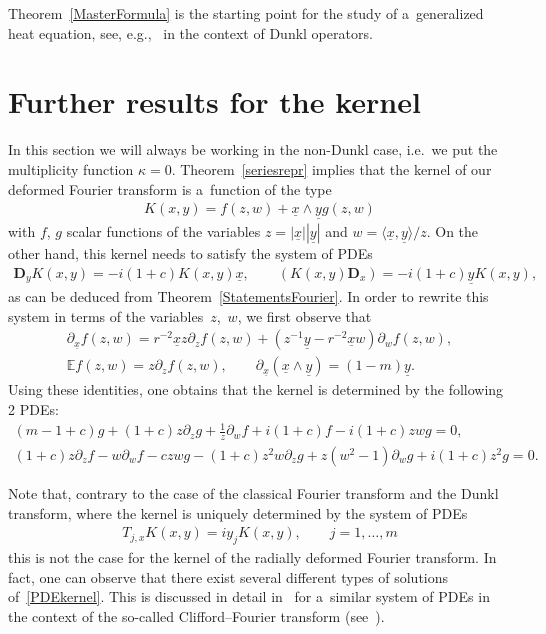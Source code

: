 \documentclass[pdftex]{sigma}
\numberwithin{equation}{section}
\numberwithin{theorem}{section}
\numberwithin{proposition}{section}
\numberwithin{lemma}{section}
\numberwithin{corollary}{section}
\numberwithin{definition}{section}
\numberwithin{example}{section}
\numberwithin{remark}{section}
\numberwithin{note}{section}
\theoremstyle{remark}
\newcommand{\mE}{\mathbb{E}}
\newcommand{\dD}{\textbf{D}}
\newcommand{\ux}{\underline{x}}
\newcommand{\uy}{\underline{y}}
\newcommand{\upx}{\partial_{\underline{x}}}
\def\k{{\kappa}}
\def\la{{\langle}}
\def\ra{{\rangle}}
\begin{document}
\begin{remark}
Theorem~\ref{MasterFormula} is the starting point for the study of a~generalized heat equation, see,
e.g.,~\cite[Lemma 4.5(1)]{MR1620515} in the context of Dunkl operators.
\end{remark}

\section{Further results for the kernel}\label{section8}

In this section we will always be working in the non-Dunkl case, i.e.\ we put the multiplicity
function $\k=0$.
Theorem~\ref{seriesrepr} implies that the kernel of our deformed Fourier transform is a~function of
the type
\begin{gather*}
K(x,y)=f(z,w)+\ux\wedge\uy g(z,w)
\end{gather*}
with $f$, $g$ scalar functions of the variables $z=|\ux||\uy|$ and $w=\la\ux,\uy\ra/z$.
On the other hand, this kernel needs to satisfy the system of PDEs
\begin{gather*}
\dD_{y} K(x,y)= -i(1+c) K(x,y) \ux,\qquad
\left( K(x,y) \dD_{x} \right) = -i (1+c) \uy K(x,y),
\end{gather*}
as can be deduced from Theorem~\ref{StatementsFourier}.
In order to rewrite this system in terms of the variables~$z$,~$w$, we f\/irst observe that
\begin{gather*}
\upx f(z,w) = r^{-2} \ux z \partial_{z} f(z, w) + \left( z^{-1} \uy - r^{-2} \ux w
\right)\partial_{w}f(z, w),\\
\mE f(z, w) = z \partial_{z} f(z, w),\qquad
\upx \left( \ux \wedge \uy \right) = (1-m) \uy.
\end{gather*}
Using these identities, one obtains that the kernel is determined by the following 2 PDEs:
\begin{gather}
(m-1+c)g + (1+c) z \partial_{z}g +\frac{1}{z}\partial_{w} f + i(1+c)f -i(1+c) zw g=0,\nonumber\\
(1+c) z \partial_{z}f - w \partial_{w} f -c zw g -(1+c)z^{2} w \partial_{z} g + z( w^{2}-1)
\partial_{w}g+i(1+c) z^{2} g=0.\label{PDEkernel}
\end{gather}

\begin{remark}
Note that, contrary to the case of the classical Fourier transform and the Dunkl transform, where
the kernel is uniquely determined by the system of PDEs
\begin{gather*}
T_{j,x}K(x,y)=i y_{j}K(x,y),\qquad j=1,\ldots,m
\end{gather*}
this is not the case for the kernel of the radially deformed Fourier transform.
In fact, one can observe that there exist several dif\/ferent types of solutions of~\eqref{PDEkernel}.
This is discussed in detail in~\cite{DBNS} for a~similar system of PDEs in the context of the
so-called Clif\/ford--Fourier transform (see~\cite{DBXu}).
\end{remark}
\end{document}
